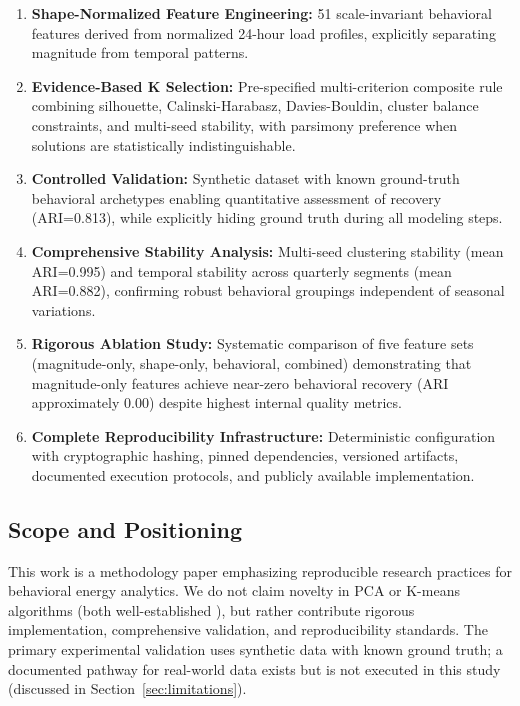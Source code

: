 \documentclass[11pt,a4paper]{article}
\begin{document}
\begin{enumerate}
    \item \textbf{Shape-Normalized Feature Engineering:} 51 scale-invariant behavioral features derived from normalized 24-hour load profiles, explicitly separating magnitude from temporal patterns.
    
    \item \textbf{Evidence-Based K Selection:} Pre-specified multi-criterion composite rule combining silhouette, Calinski-Harabasz, Davies-Bouldin, cluster balance constraints, and multi-seed stability, with parsimony preference when solutions are statistically indistinguishable.
    
    \item \textbf{Controlled Validation:} Synthetic dataset with known ground-truth behavioral archetypes enabling quantitative assessment of recovery (ARI=0.813), while explicitly hiding ground truth during all modeling steps.
    
    \item \textbf{Comprehensive Stability Analysis:} Multi-seed clustering stability (mean ARI=0.995) and temporal stability across quarterly segments (mean ARI=0.882), confirming robust behavioral groupings independent of seasonal variations.
    
    \item \textbf{Rigorous Ablation Study:} Systematic comparison of five feature sets (magnitude-only, shape-only, behavioral, combined) demonstrating that magnitude-only features achieve near-zero behavioral recovery (ARI approximately 0.00) despite highest internal quality metrics.
    
    \item \textbf{Complete Reproducibility Infrastructure:} Deterministic configuration with cryptographic hashing, pinned dependencies, versioned artifacts, documented execution protocols, and publicly available implementation.
\end{enumerate}

\subsection{Scope and Positioning}

This work is a methodology paper emphasizing reproducible research practices for behavioral energy analytics. We do not claim novelty in PCA or K-means algorithms (both well-established \cite{jolliffe2002pca,lloyd1982least,arthur2007kmeans}), but rather contribute rigorous implementation, comprehensive validation, and reproducibility standards. The primary experimental validation uses synthetic data with known ground truth; a documented pathway for real-world data exists but is not executed in this study (discussed in Section~\ref{sec:limitations}).
\end{document}
